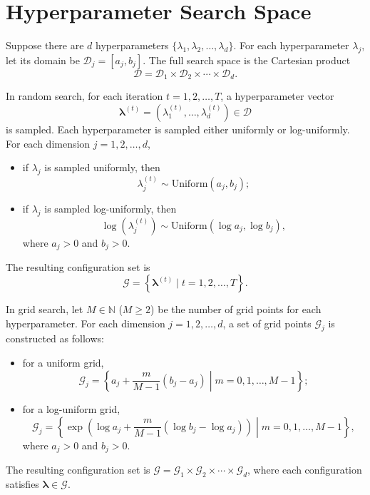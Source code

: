 \section[\appendixname~\thesection]{Hyperparameter Search Space}
\label{sec:appendix_a}

Suppose there are \(d\) hyperparameters \(\{ \lambda_1, \lambda_2, \dots, \lambda_d \}\).
For each hyperparameter \(\lambda_j\), let its domain be \(\mathcal{D}_j = [a_j, b_j]\).
The full search space is the Cartesian product
\[
	\mathcal{D} = \mathcal{D}_1 \times \mathcal{D}_2 \times \cdots \times \mathcal{D}_d .
\]

In random search, for each iteration \(t = 1, 2, \dots, T\), a hyperparameter vector
\[
	\bm{\lambda}^{(t)} = \left(\lambda_1^{(t)}, \dots, \lambda_d^{(t)}\right) \in \mathcal{D}
\]
is sampled. Each hyperparameter is sampled either uniformly or log-uniformly.
For each dimension \(j = 1, 2, \dots, d\),
\begin{itemize}
	\item if \(\lambda_j\) is sampled uniformly, then
	      \[
		      \lambda_j^{(t)} \sim \mathrm{Uniform}(a_j, b_j);
	      \]

	\item if \(\lambda_j\) is sampled log-uniformly, then
	      \[
		      \log\left(\lambda_j^{(t)}\right) \sim \mathrm{Uniform}(\log a_j, \log b_j),
	      \]
	      where \(a_j > 0\) and \(b_j > 0\).

\end{itemize}
\noindent The resulting configuration set is
\[
	\mathcal{G} = \left\{ \bm{\lambda}^{(t)} \mid t = 1, 2, \dots, T \right\}.
\]

In grid search, let \(M \in \mathbb{N}\) (\(M \ge 2\)) be the number of grid points for each hyperparameter.
For each dimension \(j = 1, 2, \dots, d\), a set of grid points \(\mathcal{G}_j\) is constructed as follows:
\begin{itemize}
	\item for a uniform grid,
	      \[
		      \mathcal{G}_j = \left\{ a_j + \frac{m}{M - 1}(b_j - a_j) \middle| m = 0, 1, \dots, M - 1 \right\};
	      \]
	\item for a log-uniform grid,
	      \[
		      \mathcal{G}_j = \left\{ \exp \left( \log a_j + \frac{m}{M - 1}(\log b_j - \log a_j) \right) \middle| m = 0, 1, \dots, M - 1 \right\},
	      \]
	      where \(a_j > 0\) and \(b_j > 0\).
\end{itemize}
\noindent The resulting configuration set is \(\mathcal{G} = \mathcal{G}_1 \times \mathcal{G}_2 \times \cdots \times \mathcal{G}_d\), where each configuration satisfies \(\bm{\lambda} \in \mathcal{G}\).

